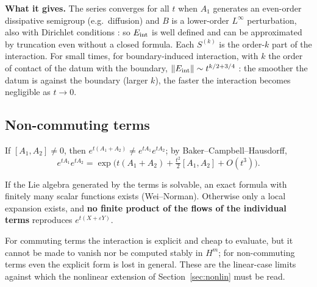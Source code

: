 \textbf{What it gives.} The series converges for all $t$ when $A_1$ generates an even-order dissipative semigroup (e.g.\ diffusion) and $B$ is a lower-order $L^\infty$ perturbation, also with Dirichlet conditions  : so $E_{\mathrm{int}}$ is well defined and can be approximated by truncation even without a closed formula. Each $S^{(k)}$ is the order-$k$ part of the interaction. For small times, for boundary-induced interaction, with $k$ the order of contact of the datum with the boundary, $\|E_{\mathrm{int}}\|\sim t^{k/2+3/4}$  \proved{}: the smoother the datum is against the boundary (larger $k$), the faster the interaction becomes negligible as $t\to0$.

\subsection{Non-commuting terms}\label{sec:noncomm}
If $[A_1,A_2]\ne0$, then $e^{t(A_1+A_2)}\neq e^{tA_1}e^{tA_2}$; by Baker--Campbell--Hausdorff,
\[
e^{tA_1}e^{tA_2}=\exp\!\Big(t(A_1+A_2)+\tfrac{t^2}{2}[A_1,A_2]+O(t^3)\Big).
\]
\begin{proposition}\label{thm:lie}
If the Lie algebra generated by the terms is solvable, an exact formula with finitely many scalar functions exists (Wei--Norman). Otherwise only a local expansion exists, and \textbf{no finite product of the flows of the individual terms} reproduces $e^{t(X+\varepsilon Y)}$.
\end{proposition}
\begin{takeaway}
For commuting terms the interaction is explicit and cheap to evaluate, but it cannot be made to vanish nor be computed stably in $H^m$; for non-commuting terms even the explicit form is lost in general. These are the linear-case limits against which the nonlinear extension of Section~\ref{sec:nonlin} must be read.
\end{takeaway}

